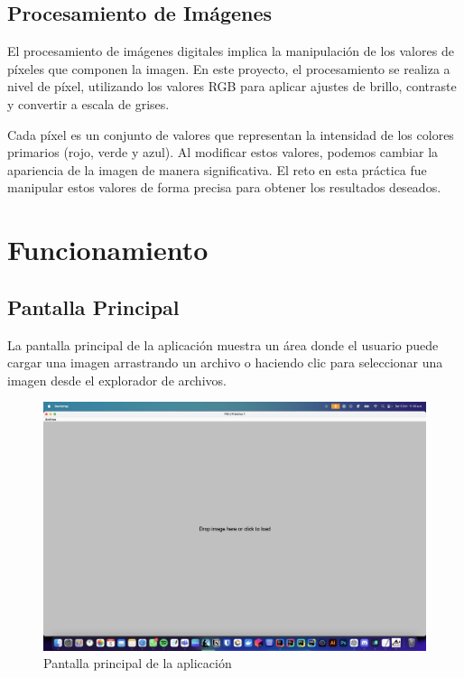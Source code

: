 \documentclass{report}
\begin{document}
  \section{Procesamiento de Imágenes}\label{sec:procesamiento-de-imagenes}
  El procesamiento de imágenes digitales implica la manipulación de los valores de píxeles que componen la imagen.
  En este proyecto, el procesamiento se realiza a nivel de píxel, utilizando los valores RGB para aplicar ajustes de brillo, contraste y convertir a escala de grises.

  Cada píxel es un conjunto de valores que representan la intensidad de los colores primarios (rojo, verde y azul).
  Al modificar estos valores, podemos cambiar la apariencia de la imagen de manera significativa.
  El reto en esta práctica fue manipular estos valores de forma precisa para obtener los resultados deseados.


  \chapter{Funcionamiento}\label{ch:funcionamiento}


  \section{Pantalla Principal}\label{sec:pantalla-principal}
  La pantalla principal de la aplicación muestra un área donde el usuario puede cargar una imagen arrastrando un archivo o haciendo clic para seleccionar una imagen desde el explorador de archivos.

  \begin{figure}[H]
    \centering
    \includegraphics[width=\textwidth]{image/functionality/pantalla-principal}
    \caption{Pantalla principal de la aplicación}\label{fig:pantalla-principal}
  \end{figure}
\end{document}
